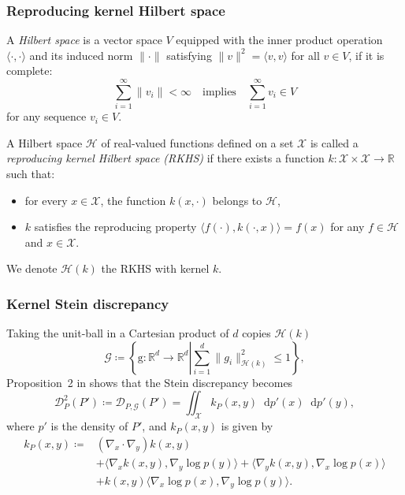 \documentclass{beamer}
\newcommand*\diff{\mathop{}\!\mathrm{d}}
\begin{document}
\begin{frame}
\frametitle{Reproducing kernel Hilbert space}

A \textit{Hilbert space} is a vector space $V$ equipped with the inner product operation $\langle \cdot, \cdot \rangle$ and its induced norm $\|\cdot\|$ satisfying $\|v\|^2 = \langle v, v \rangle$ for all $v \in V$, if it is complete:
\begin{equation*}
\sum_{i=1}^\infty \|v_i\| < \infty \quad \text{implies} \quad \sum_{i=1}^\infty v_i \in V
\end{equation*}
for any sequence $v_i \in V$.

A Hilbert space $\mathcal{H}$ of real-valued functions defined on a set $\mathcal{X}$ is called a \textit{reproducing kernel Hilbert space (RKHS)} if there exists a function $k: \mathcal{X} \times \mathcal{X} \to \mathbb{R}$ such that:
\begin{itemize}
\item for every $x \in \mathcal{X}$, the function $k(x, \cdot)$ belongs to $\mathcal{H}$,
\item $k$ satisfies the reproducing property $\langle f(\cdot), k(\cdot, x)\rangle = f(x)$ for any $f \in \mathcal{H}$ and $x \in \mathcal{X}$.
\end{itemize}

We denote $\mathcal{H}(k)$ the RKHS with kernel $k$.

\end{frame}

\begin{frame}
\frametitle{Kernel Stein discrepancy}

Taking the unit-ball in a Cartesian product of $d$ copies $\mathcal{H}(k)$
\begin{equation*}
\mathcal{G} \coloneq \left\{ \mathrm{g} : \mathbb{R}^d \to \mathbb{R}^d \left| \sum_{i=1}^d \|g_i\|^2_{\mathcal{H}(k)} \leq 1 \right.\right\},
\label{eq:unit-ball}
\end{equation*}
Proposition~2 in \cite{gorhamMeasuringSampleQuality2017} shows that the Stein discrepancy becomes
\begin{equation*}
\mathcal{D}_{P}^2(P') \coloneq \mathcal{D}_{P, \mathcal{G}}(P') = \iint_\mathcal{X} k_P(x, y) \diff p'(x) \diff p'(y),
\label{eq:stein-discrepancy-sqrt-expectation}
\end{equation*}
where $p'$ is the density of $P'$, and $k_P(x, y)$ is given by
\begin{equation*}
\begin{aligned}
k_P(x, y) \coloneq 
&(\nabla_x\cdot\nabla_y) k(x,y) \\
&+ \langle \nabla_x k(x, y), \nabla_y \log p(y) \rangle + \langle \nabla_y k(x, y), \nabla_x \log p(x) \rangle \\
&+ k(x, y) \langle \nabla_x \log p(x), \nabla_y \log p(y) \rangle.
\end{aligned}
\end{equation*}

\end{frame}
\end{document}
